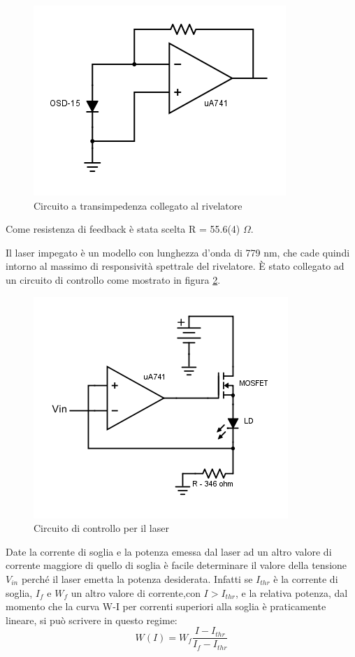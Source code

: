 \documentclass[a4paper]{article}
\begin{document}
\begin{figure}[htp]
\centering
\includegraphics[scale=.45]{transimpedance}
\caption{Circuito a transimpedenza collegato al rivelatore}
\label{fig:trans}
\end{figure}

Come resistenza di feedback è stata scelta R = 55.6(4) $\Omega$.

Il laser impegato è un modello %
con lunghezza d'onda di 779 nm, che cade quindi intorno al massimo di responsività spettrale del rivelatore. È stato collegato ad un circuito di controllo
come mostrato in figura \ref{fig:laser}.

\begin{figure}[htp]
\centering
\includegraphics[scale=.5]{laser}
\caption{Circuito di controllo per il laser}
\label{fig:laser}
\end{figure} 

Date la corrente di soglia e la potenza emessa dal laser ad un altro valore di corrente maggiore di quello di soglia è facile determinare il valore della tensione $V_{in}$ perché il laser emetta la potenza desiderata. Infatti se $I_{thr}$ è la corrente di soglia, $I_f$ e $W_f$ un altro valore di corrente,con $I>I_{thr}$, e la relativa potenza, dal momento che la curva W-I per correnti superiori alla soglia è praticamente lineare, si può scrivere in questo regime:
\begin{equation}
W(I) = W_f \frac{I-I_{thr}}{I_f - I_{thr}}
\end{equation}
\end{document}
